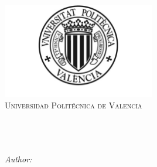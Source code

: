 \begin{titlepage}
\begin{center}
 
\includegraphics[width=0.50\textwidth]{../shared/figures/logoUPV.pdf}\\[1cm]
\textsc{\LARGE Universidad Polit\'ecnica de Valencia}\\[1.4cm]
\textsc{\Large \docSubject}\\[1.4cm]
 
 
\HRule \\[0.4cm]
{ \huge \bfseries \docTitle}
\HRule \\[1.4cm]
 
\begin{flushleft} \large
\emph{Author:}\\
\docAuthor
\end{flushleft}

\vfill
 
{\large \docDate}
 
\end{center}
\end{titlepage}